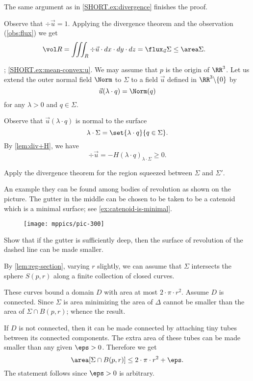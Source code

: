 The same argument as in \ref{SHORT.ex:divergence} finishes the proof.



Observe that $\div\vec u=1$.
Applying the divergence theorem and the observation (\ref{obs:flux}) we get
\begin{align*}
\vol R&=\iiint_R\div\vec u\cdot dx\cdot dy\cdot dz
=
\flux_{\vec u}\Sigma
\le
\area\Sigma.
\end{align*}




\parbf{\ref{ex:mean-convex}}; \ref{SHORT.ex:mean-convex:u}.
We may assume that $p$ is the origin of $\RR^3$.
Let us extend the outer normal field $\Norm$ to $\Sigma$ to a field $\vec u$ defined in $\RR^3\backslash\{0\}$ by
\[\vec u(\lambda\cdot q)=\Norm(q)\]
for any $\lambda>0$ and $q\in\Sigma$.

Observe that $\vec u(\lambda\cdot q)$ is normal to the surface 
\[\lambda\cdot\Sigma=\set{\lambda\cdot q}{q\in\Sigma}.\]
By \ref{lem:div+H}, we have
\[\div \vec u=-H(\lambda\cdot q)_{\lambda\cdot\Sigma}\ge 0.\]

 Apply the divergence theorem for the region squeezed between $\Sigma$ and $\Sigma'$.

An example they can be found among bodies of revolution as shown on the picture.
The gutter in the middle can be chosen to be taken to be a catenoid which is a minimal surface; see \ref{ex:catenoid-is-minimal}.
\begin{figure}[h!]
\vskip-0mm
\centering
\texttt{[image: mppics/pic-300]}
\vskip0mm
\end{figure}
Show that if the gutter is sufficiently deep, then the surface of revolution of the dashed line can be made smaller.

By \ref{lem:reg-section}, varying $r$ slightly, we can assume that $\Sigma$ intersects the sphere $S(p,r)$ along a finite collection of closed curves.

These curves bound a domain $D$ with area at most $2\cdot \pi\cdot r^2$.
Assume $D$ is connected.
Since $\Sigma$ is area minimizing the area of $\Delta$ cannot be smaller than the area of $\Sigma\cap B(p,r)$;
whence the result.

If $D$ is not connected, then
it can be made connected by attaching tiny tubes between its connected components.
The extra area of these tubes can be made smaller than any given $\eps>0$.
Therefore we get 
\[\area[\Sigma\cap B(p,r)]\le 2\cdot \pi\cdot r^2+\eps.\]
The statement follows since $\eps>0$ is arbitrary.




